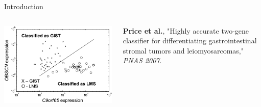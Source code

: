 \documentclass[10pt, aspectratio=169]{beamer} %
\begin{document}
\begin{frame}{Introduction}
\begin{columns}
\includegraphics[width=\columnwidth]{Gist_Classification.png}\\
{\tiny \textbf{Price et al.}, "Highly accurate two-gene classifier for differentiating gastrointestinal stromal tumors and leiomyosarcomas," \emph{PNAS 2007}.\par}
\end{columns}
\end{frame}
\end{document}
